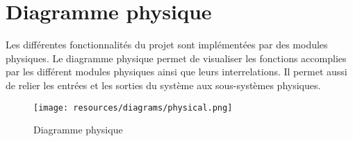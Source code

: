 \chapter{Diagramme physique}

Les différentes fonctionnalités du projet sont implémentées par des modules physiques. Le diagramme physique permet de visualiser les fonctions accomplies par les différent modules physiques ainsi que leurs interrelations. Il permet aussi de relier les entrées et les sorties du système aux sous-systèmes physiques.

\begin{landscape}
\begin{figure}
  \centering
  \texttt{[image: resources/diagrams/physical.png]}
  \caption{Diagramme physique}
\end{figure}
\end{landscape}

